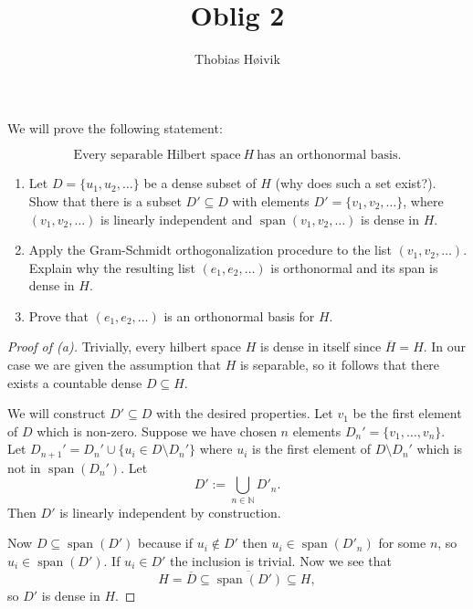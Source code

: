 

\title{\huge{Oblig 2}}
\author{\LARGE{Thobias Høivik}}
\date{}


\maketitle

\newpage
\begin{prob*}[1]
    We will prove the following statement:

    \[ 
        \text{Every separable Hilbert space} \ H \ \text{has an 
        orthonormal basis.}
    \]

    \begin{enumerate}[label=\alph*)]
        \item Let $D = \{u_1,u_2,\ldots\}$ be a dense subset 
            of $H$ (why does such a set exist?). 
            Show that there is a subset $D' \subseteq D$ with 
            elements $D' = \{v_1,v_2,\ldots\}$, where 
            $(v_1,v_2,\ldots)$ is linearly independent and 
            $\operatorname{span}(v_1,v_2,\ldots)$ is dense in 
            $H$.
        \item Apply the Gram-Schmidt orthogonalization procedure 
            to the list $(v_1,v_2,\ldots)$. Explain why the resulting 
            list $(e_1,e_2,\ldots)$ is orthonormal and its span 
            is dense in $H$.
        \item Prove that $(e_1,e_2,\ldots)$ is an orthonormal 
            basis for $H$.
    \end{enumerate}
\end{prob*}
\begin{proof}[Proof of (a)]
    Trivially, every hilbert space $H$ is dense in itself since 
    $\overline H = H$. In our case we are given the assumption 
    that $H$ is separable, so it follows that there exists 
    a countable dense $D \subseteq H$.

    We will construct $D' \subseteq D$ with the desired properties. 
    Let $v_1$ be the first element of $D$ which is non-zero. 
    Suppose we have chosen $n$ elements $D_n' = \{v_1,\ldots,v_n\}$. 
    Let $D_{n+1}' = D_n' \cup \{u_i \in D\setminus D_n'\}$ where 
    $u_i$ is the first element of $D \setminus D_n'$ which is 
    not in $\operatorname{span}(D_n')$. Let 
    \[
        D' := \bigcup_{n \in \mathbb N} D'_{n}.
    \]
    Then $D'$ is linearly independent by construction.

    Now $D \subseteq \operatorname{span}(D')$ because if 
    $u_i \not\in D'$ then 
    $u_i \in \operatorname{span}(D'_n)$ for some $n$, so 
    $u_i \in \operatorname{span}(D')$. If $u_i \in D'$ the inclusion 
    is trivial. 
    Now we see that 
    \[
        H = \overline D \subseteq \overline{\operatorname{span}(D')} 
        \subseteq H,
    \]
    so $D'$ is dense in $H$.
\end{proof}

